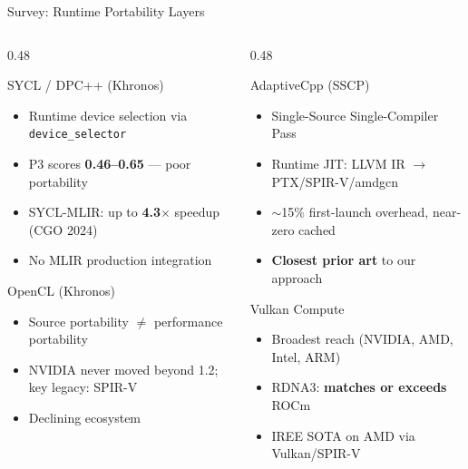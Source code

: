 \documentclass[aspectratio=169,10pt]{beamer}
\begin{document}
\begin{frame}{Survey: Runtime Portability Layers}
  \begin{columns}[T]
    \begin{column}{0.48\textwidth}
      \begin{block}{SYCL / DPC++ (Khronos)}
        \begin{itemize}\itemsep0pt
          \item Runtime device selection via \texttt{device\_selector}
          \item P3 scores \textbf{0.46--0.65} --- poor portability
          \item SYCL-MLIR: up to \textbf{4.3$\times$} speedup (CGO 2024)
          \item No MLIR production integration
        \end{itemize}
      \end{block}
      \begin{block}{OpenCL (Khronos)}
        \begin{itemize}\itemsep0pt
          \item Source portability $\neq$ performance portability
          \item NVIDIA never moved beyond 1.2; key legacy: SPIR-V
          \item \textcolor{codered}{Declining ecosystem}
        \end{itemize}
      \end{block}
    \end{column}
    \begin{column}{0.48\textwidth}
      \begin{block}{AdaptiveCpp (SSCP)}
        \begin{itemize}\itemsep0pt
          \item Single-Source Single-Compiler Pass
          \item Runtime JIT: LLVM IR $\to$ PTX/SPIR-V/amdgcn
          \item $\sim$15\% first-launch overhead, near-zero cached
          \item \textbf{Closest prior art} to our approach
        \end{itemize}
      \end{block}
      \begin{block}{Vulkan Compute}
        \begin{itemize}\itemsep0pt
          \item Broadest reach (NVIDIA, AMD, Intel, ARM)
          \item RDNA3: \textbf{matches or exceeds} ROCm
          \item IREE SOTA on AMD via Vulkan/SPIR-V
        \end{itemize}
      \end{block}
    \end{column}
  \end{columns}
\end{frame}
\end{document}
